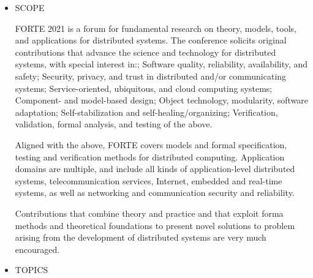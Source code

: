 \documentclass{article}
\begin{document}
\begin{itemize}\item  SCOPE 
 
  FORTE 2021 is a forum for fundamental research on theory, models, tools, and applications for distributed systems. The conference solicits original contributions that advance the science and technology for distributed systems, with special interest in:; Software quality, reliability, availability, and safety; Security, privacy, and trust in distributed and/or communicating systems; Service-oriented, ubiquitous, and cloud computing systems; Component- and model-based design; Object technology, modularity, software adaptation; Self-stabilization and self-healing/organizing; Verification, validation, formal analysis, and testing of the above. 
 
  Aligned with the above, FORTE covers models and formal specification, testing and verification methods for distributed computing. Application domains are multiple, and include all kinds of application-level distributed systems, telecommunication services, Internet, embedded and real-time systems, as well as networking and communication security and reliability. 
 
  Contributions that combine theory and practice and that exploit forma methods and theoretical foundations to present novel solutions to problem arising from the development of distributed systems are very much encouraged. 
 
\item  TOPICS 
 

\end{itemize}
\end{document}
